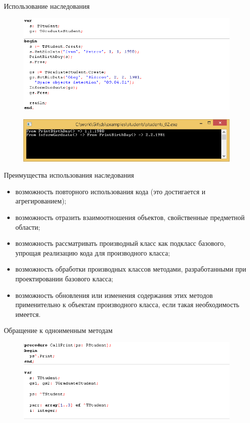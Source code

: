 \documentclass{beamer}
\begin{document}
\begin{frame}{Использование наследования}
\begin{figure}[h]
\centering
\includegraphics[scale=0.6]{images/lec06-pic18.png}
\end{figure}
\begin{figure}[h]
\centering
\includegraphics[scale=0.6]{images/lec06-pic19.png}
\end{figure}
\end{frame}

\begin{frame}{Преимущества использования наследования}
\begin{itemize}
\item возможность повторного использования кода (это достигается и агрегированием);
\item возможность отразить взаимоотношения объектов, свойственные предметной области;
\item возможность рассматривать производный класс как подкласс базового,
упрощая реализацию кода для производного класса;
\item возможность обработки производных классов методами, разработанными
при проектировании базового класса;
\item возможность обновления или изменения содержания этих методов применительно к объектам производного класса, если такая необходимость имеется.
\end{itemize}
\end{frame}

\begin{frame}{Обращение к одноименным методам}
\begin{figure}[h]
\centering
\includegraphics[scale=0.6]{images/lec06-pic20.png}
\end{figure}
\end{frame}
\end{document}
